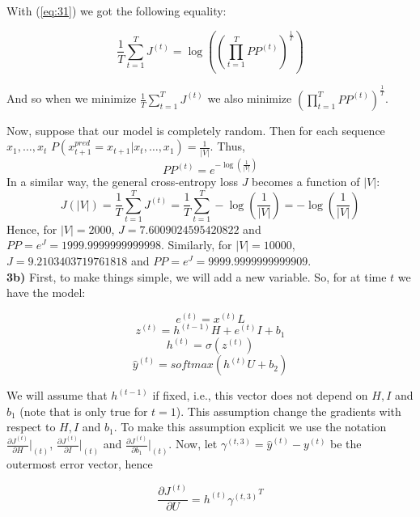 \documentclass{article}
\begin{document}
With (\ref{eq:31}) we got the following equality:

\begin{equation}\label{eq:32}
\frac{1}{T} \sum_{t=1}^{T} J^{(t)} = \log({(\prod_{t=1}^{T}PP^{(t)})}^{\frac{1}{T}})
\end{equation}

And so when we minimize $\frac{1}{T} \sum_{t=1}^{T} J^{(t)}$ we also minimize ${(\prod_{t=1}^{T}PP^{(t)})}^{\frac{1}{T}}$.

Now, suppose that our model is completely random. Then for each sequence $ x_{1}, \dots,x_{t}$ $P(x^{pred}_{t+1} = x_{t+1} | x_{t}, \dots,x_{1}) = \frac{1}{|V|}$. Thus, 
\[
PP^{(t)} = e^{-\log(\frac{1}{|V|})}
\]
In a similar way, the general cross-entropy loss $J$ becomes a function of $|V|$:
\[
J(|V|) = \frac{1}{T} \sum_{t=1}^{T} J^{(t)} = \frac{1}{T} \sum_{t=1}^{T} -\log(\frac{1}{|V|}) = - \log(\frac{1}{|V|})
\]
Hence, for $|V| = 2000$, $J = 7.6009024595420822$ and $PP = e^{J} = 1999.9999999999998$. Similarly, for $|V| = 10000$, $J = 9.2103403719761818$ and $PP = e^{J} = 9999.9999999999909$.\\

\textbf{3b)}
First, to make things simple, we will add a new variable. So, for at time $t$ we have the model:

\begin{equation}\label{eq:33}
e^{(t)} = x^{(t)}L
\end{equation}
 \begin{equation}\label{eq:34}
z^{(t)} = h^{(t-1)}H + e^{(t)} I + b_{1}
\end{equation}
 \begin{equation}\label{eq:35}
h^{(t)} = \sigma(z^{(t)})
\end{equation}
\begin{equation}\label{eq:36}
\hat{y}^{(t)} = softmax(h^{(t)}U + b_{2})
\end{equation}

We will assume that $h^{(t-1)}$ if fixed, i.e., this vector does not depend on $H,I$ and $b_{1}$ (note that is only true for $t=1$). This assumption change the gradients with respect to $H,I$ and $b_{1}$. To make this assumption explicit we use the notation $\frac{\partial J^{(t)}}{\partial H}\vert_{(t)} $, $\frac{\partial J^{(t)}}{\partial I}\vert_{(t)} $ and $\frac{\partial J^{(t)}}{\partial b_{1}}\vert_{(t)}$.
Now, let $\gamma^{(t,3)} = \hat{y}^{(t)} - y^{(t)}$ be the outermost error vector, hence

\begin{equation}\label{eq:37}
\frac{\partial J^{(t)}}{\partial  U} = {h^{(t)} \gamma^{(t,3)}}^{T}
\end{equation}
\end{document}
